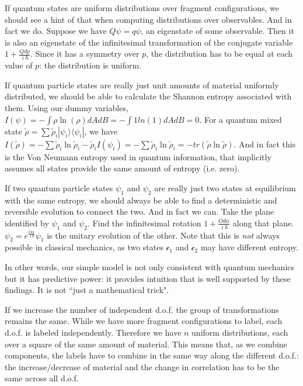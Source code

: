 \documentclass[aps,pra,10pt,twocolumn,floatfix,nofootinbib]{revtex4-1}
\numberwithin{equation}{section}
\theoremstyle{definition}
\begin{document}
If quantum states are uniform distributions over fragment configurations, we should see a hint of that when computing distributions over observables. And in fact we do. Suppose we have $Q\psi = q \psi$, an eigenstate of some observable. Then it is also an eigenstate of the infinitesimal transformation of the conjugate variable $1+\frac{Qdp}{\imath\hbar}$. Since it has a symmetry over $p$, the distribution has to be equal at each value of $p$: the distribution is uniform.

If quantum particle states are really just unit amounts of material uniformly distributed, we should be able to calculate the Shannon entropy associated with them. Using our dummy variables, $I(\psi) = - \int \rho \ln (\rho) dA dB = - \int 1 ln (1) dA dB = 0$. For a quantum mixed state $\tilde{\rho} = \sum \tilde{\rho}_i |\psi_i\rangle \langle \psi_i |$, we have $I(\tilde{\rho}) = - \sum \tilde{\rho}_i \ln \tilde{\rho}_i - \tilde{\rho}_i I(\psi_i) = - \sum \tilde{\rho}_i \ln \tilde{\rho}_i = -tr(\tilde{\rho} \ln \tilde{\rho})$. And in fact this is the Von Neumann entropy used in quantum information, that implicitly assumes all states provide the same amount of entropy (i.e. zero).

If two quantum particle states $\psi_1$ and $\psi_2$ are really just two states at equilibrium with the same entropy, we should always be able to find a deterministic and reversible evolution to connect the two. And in fact we can. Take the plane identified by $\psi_1$ and $\psi_2$. Find the infinitesimal rotation $1 + \frac{Od\alpha}{\imath\hbar}$ along that plane. $\psi_2 = e^{\frac{O\alpha}{\imath\hbar}} \psi_1$ is the unitary evolution of the other. Note that this is \emph{not} always possible in classical mechanics, as two states $\mathcal{c}_1$ and $\mathcal{c}_2$ may have different entropy.

In other words, our simple model is not only consistent with quantum mechanics but it has predictive power: it provides intuition that is well supported by these findings. It is not ``just a mathematical trick".

If we increase the number of independent d.o.f. the group of transformations remains the same. While we have more fragment configurations to label, each d.o.f. is labeled independently. Therefore we have $n$ uniform distributions, each over a square of the same amount of material. This means that, as we combine components, the labels have to combine in the same way along the different d.o.f.: the increase/decrease of material and the change in correlation has to be the same across all d.o.f.
\end{document}
